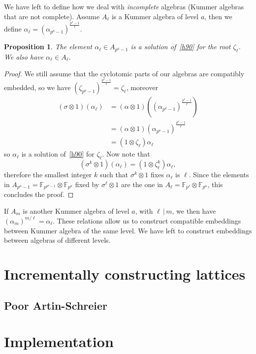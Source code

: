\documentclass{sig-alternate}
\newtheorem{proposition}{Proposition}
\begin{document}
We have left to define how we deal with \emph{incomplete} algebras (Kummer
algebras that are not complete). Assume $A_\ell$ is a Kummer algebra of level
$a$, then we define $\alpha_\ell = (\alpha_{p^a-1})^{\frac{p^a-1}{\ell}}$.
\begin{proposition}
  The element $\alpha_\ell\in A_{p^a-1}$ is a solution of~\eqref{h90} for the
  root $\zeta_\ell$. We also have $\alpha_\ell\in A_\ell$.
\end{proposition}
\begin{proof}
We still assume that the cyclotomic parts of our algebras are compatibly
embedded, so we have $(\zeta_{p^a-1})^{\frac{p^a-1}{\ell}} = \zeta_\ell$,
moreover
\begin{align*}
  (\sigma\otimes1)(\alpha_\ell) &=
  (\alpha\otimes1)((\alpha_{p^a-1})^{\frac{p^a-1}{\ell}}) \\
  &= (\alpha\otimes1)(\alpha_{p^a-1})^{\frac{p^a-1}{\ell}} \\
  &= (1\otimes\zeta_\ell)\alpha_\ell
\end{align*}
so $\alpha_\ell$ is a solution of~\eqref{h90} for $\zeta_\ell$. Now note that 
\[
  (\sigma^k\otimes1)(\alpha_\ell) = (1\otimes\zeta_\ell^k)\alpha_\ell,
\]
therefore the smallest integer $k$ such that $\sigma^k\otimes1$ fixes
$\alpha_\ell$ is $\ell$. Since the elements in
$A_{p^a-1}=\mathbb{F}_{p^{p^a-1}}\otimes\mathbb{F}_{p^a}$ fixed by
$\sigma^\ell\otimes1$ are the one in
$A_\ell = \mathbb{F}_{p^\ell}\otimes\mathbb{F}_{p^a}$, this concludes the
proof.
\end{proof}
If $A_m$ is another Kummer algebra of level $a$, with $\ell\,|\,m$, we then have
$(\alpha_m)^{m/\ell} = \alpha_\ell$. These relations allow us to construct
compatible embeddings between Kummer algebra of the same level. We have left to
construct embeddings between algebras of different levels.

\section{Incrementally constructing lattices}
\label{sec:construction}

\subsection{Poor Artin-Schreier}


\section{Implementation}
\label{sec:implementation}



\end{document}
